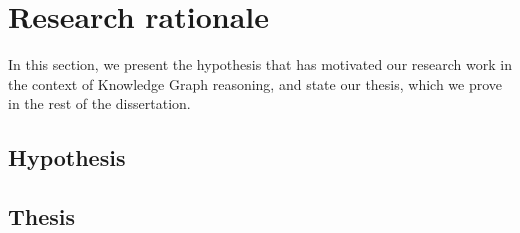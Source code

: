 \section{Research rationale}\label{sec:intro-rationale}
In this section, we present the hypothesis that has motivated our research work in the context of Knowledge Graph reasoning, and state our thesis, which we prove in the rest of the dissertation.

\subsection{Hypothesis}




\subsection{Thesis}

